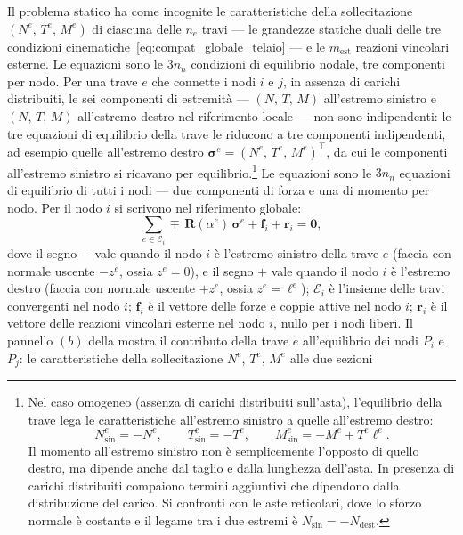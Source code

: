 Il problema statico ha come incognite le caratteristiche
della sollecitazione $(N^e,\, T^e,\, M^e)$ di ciascuna
delle $n_e$ travi --- le grandezze statiche duali delle
tre condizioni cinematiche~\eqref{eq:compat_globale_telaio}
--- e le $m_\text{est}$ reazioni vincolari esterne.
Le equazioni sono le $3n_n$ condizioni di equilibrio
nodale, tre componenti per nodo.
Per una trave $e$ che connette i nodi $i$ e $j$, in assenza
di carichi distribuiti, le sei componenti di estremità ---
$(N,\, T,\, M)$ all'estremo sinistro e $(N,\, T,\, M)$
all'estremo destro nel riferimento locale --- non sono
indipendenti: le tre equazioni di equilibrio della trave
le riducono a tre componenti indipendenti, ad esempio
quelle all'estremo destro
$\bm{\sigma}^e = (N^e,\, T^e,\, M^e)^\top$,
da cui le componenti all'estremo sinistro si ricavano
per equilibrio.\footnote{%
	Nel caso omogeneo (assenza di carichi distribuiti
	sull'asta), l'equilibrio della trave lega le
	caratteristiche all'estremo sinistro a quelle
	all'estremo destro:
	\[
	N^e_{\text{sin}} = -N^e,
	\qquad
	T^e_{\text{sin}} = -T^e,
	\qquad
	M^e_{\text{sin}} = -M^e + T^e\ell^e.
	\]
	Il momento all'estremo sinistro non è
	semplicemente l'opposto di quello destro, ma
	dipende anche dal taglio e dalla lunghezza
	dell'asta. In presenza di carichi distribuiti
	compaiono termini aggiuntivi che dipendono
	dalla distribuzione del carico. Si confronti
	con le aste reticolari, dove lo sforzo normale
	è costante e il legame tra i due estremi è
	$N_{\text{sin}} = -N_{\text{dest}}$.}
Le equazioni sono le $3n_n$ equazioni di equilibrio
di tutti i nodi --- due componenti di forza e una di momento
per nodo. Per il nodo $i$ si scrivono nel riferimento
globale:
\begin{equation}\label{eq:equilibrio_nodale_telaio}
	\sum_{e \in \mathcal{E}_i}
	\mp\,\bm{R}(\alpha^e)\,
	\bm{\sigma}^e
	+ \bm{f}_i + \bm{r}_i = \bm{0},
\end{equation}
dove il segno $-$ vale quando il nodo $i$ è
l'estremo sinistro della trave $e$ (faccia con
normale uscente $-z^e$, ossia $z^e = 0$), e il
segno $+$ vale quando il nodo $i$ è l'estremo
destro (faccia con normale uscente $+z^e$, ossia
$z^e = \ell^e$); $\mathcal{E}_i$ è l'insieme delle
travi convergenti nel nodo $i$; $\bm{f}_i$ è il
vettore delle forze e coppie attive nel nodo $i$;
$\bm{r}_i$ è il vettore delle reazioni vincolari
esterne nel nodo $i$, nullo per i nodi liberi.
Il pannello $(b)$ della 
mostra il contributo della trave $e$ all'equilibrio
dei nodi $P_i$ e $P_j$: le caratteristiche della
sollecitazione $N^e$, $T^e$, $M^e$ alle due sezioni
